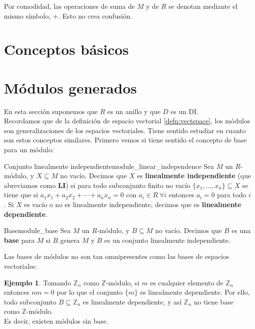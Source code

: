 \documentclass[a4paper]{book}
\theoremstyle{definition}
\theoremstyle{ejemplo}
\newtheorem{ejem}{Ejemplo}[section]
\theoremstyle{demostracion}
\newcommand{\enteros}{\mathbb{Z}}
\begin{document}
Por comodidad, las operaciones de suma de $M$ y de $R$ se denotan mediante el mismo símbolo, $+$. Esto no crea confusión. \\ 
\section{Conceptos básicos}

\section{Módulos generados}
En esta sección suponemos que $R$ es un anillo y que $D$ es un DI.\\ 
Recordamos que de la definición de espacio vectorial \eqref{defn:vectspace}, los módulos son generalizaciones de los espacios vectoriales. Tiene sentido estudiar en cuanto son estos conceptos similares. Primero vemos si tiene sentido el concepto de base para un módulo:

\begin{define}{Conjunto linealmente independiente}{module_linear_independence}
	Sea $M$ un $R$-módulo, y $X \subseteq M$ no vacío. Decimos que $X$ es \textbf{linealmente independiente} (que abreviamos como \textbf{LI}) si para todo subconjunto finito no vacío $\{ x_1, \ldots , x_n\} \subseteq X$ se tiene que si $a_1x_1 + a_2x_2 + \cdots + a_nx_n = 0$ con $a_i \in R\ \forall i$ entonces $a_i = 0$ para todo $i$. Si $X$ es vacío o no es linealmente independiente, decimos que es \textbf{linealmente dependiente}.
\end{define}

\begin{define}{Base}{module_base}
	Sea $M$ un $R$-módulo, y $B \subseteq M$ no vacío. Decimos que $B$ es una \textbf{base} para $M$ si $B$ genera $M$ y $B$ es un conjunto linealmente independiente.
\end{define}

Las bases de módulos no son tan omnipresentes como las bases de espacios vectoriales:
\begin{ejem}
	Tomando $\enteros_n$ como $\enteros$-módulo, si $m$ es cualquier elemento de $\enteros_n$ entonces $nm = 0$ por lo que el conjunto $\{ m \}$ es linealmente dependiente. Por ello, todo subconjunto $B \subseteq \enteros_n$ es linealmente dependiente, y así $\enteros_n$ no tiene base como $\enteros$-módulo.\\ 
	Es decir, existen módulos sin base.
\end{ejem}
\end{document}
